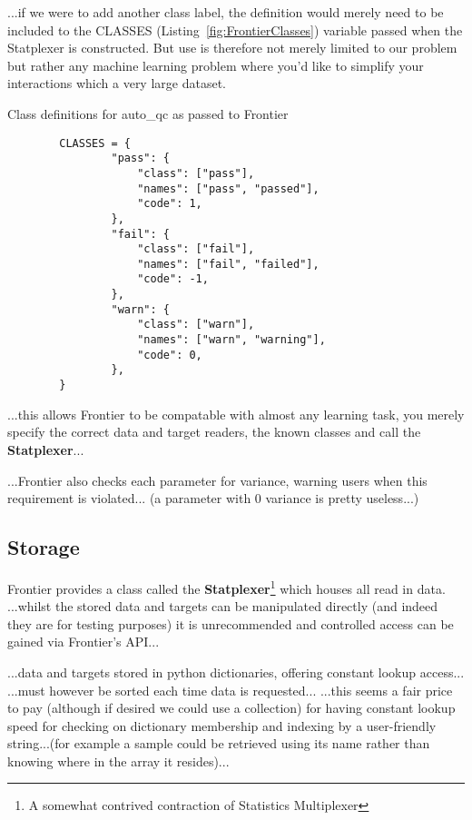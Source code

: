 ...if we were to add another
class label, the definition would merely need to be included to the CLASSES
(Listing~\ref{fig:FrontierClasses}) variable passed when the Statplexer is
constructed. But use is therefore not merely limited to our problem but rather
any machine learning problem where you'd like to simplify your interactions
which a very large dataset.

\begin{listing}[H]
    \caption[FrontierClasses]{Class definitions for auto\_qc as passed to Frontier}
    \label{fig:FrontierClasses}
    \begin{verbatim}
        CLASSES = {
                "pass": {
                    "class": ["pass"],
                    "names": ["pass", "passed"],
                    "code": 1,
                },
                "fail": {
                    "class": ["fail"],
                    "names": ["fail", "failed"],
                    "code": -1,
                },
                "warn": {
                    "class": ["warn"],
                    "names": ["warn", "warning"],
                    "code": 0,
                },
        }
    \end{verbatim}
\end{listing}

...this allows Frontier to be compatable with almost any learning task, you
merely specify the correct data and target readers, the known classes and call
the \textbf{Statplexer}...

...Frontier also checks each parameter for variance, warning users when this
requirement is violated... (a parameter with 0 variance is pretty useless...)

\subsection{Storage}

Frontier provides a class called the \textbf{Statplexer}\footnote{A somewhat
contrived contraction of Statistics Multiplexer} which houses all read in data.
...whilst the stored data and targets can be manipulated directly (and indeed
they are for testing purposes) it is unrecommended and controlled access can be
gained via Frontier's API...

...data and targets stored in python dictionaries, offering constant lookup
access...
...must however be sorted each time data is requested...
...this seems a fair price to pay (although if desired we could use a
collection) for having constant lookup speed for checking on dictionary
membership and indexing by a user-friendly string...(for example a sample could
be retrieved using its name rather than knowing where in the array it
resides)...

